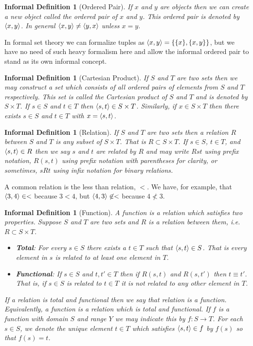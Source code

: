 \documentclass[12pt]{article}
\theoremstyle{break}
\theoremstyle{break}
\theoremstyle{break}
\theoremstyle{break}
\theoremstyle{break}
\newtheorem{informal definition}[definition]{Informal Definition}
\begin{document}
\begin{informal definition}[Ordered Pair]
If $x$ and $y$ are objects then we can create a new object called the ordered pair of $x$ and $y$.
This ordered pair is denoted by $\braket{x, y}$.
In general $\braket{x, y} \not = \braket{y, x}$ unless $x = y$.
\end{informal definition}
In formal set theory we can formalize tuples as $\braket{x, y} = \{\{x\}, \{x, y\}\}$, but we have no need of such heavy formalism here and allow the informal ordered pair to stand as its own informal concept.

\begin{informal definition}[Cartesian Product]
If $S$ and $T$ are two sets then we may construct a set which consists of all ordered pairs of elements from $S$ and $T$ respectively.
This set is called the Cartesian product of $S$ and $T$ and is denoted by $S\times T$.
If $s\in S$ and $t\in T$ then $\braket{s, t} \in S\times T$.
Similarly, if $x\in S\times T$ then there exists $s\in S$ and $t\in T$ with $x = \braket{s, t}$.
\end{informal definition}

\begin{informal definition}[Relation]
If $S$ and $T$ are two sets then a relation $R$ between $S$ and $T$ is any subset of $S\times T$. That is $R\subset S\times T$.
If $s\in S$, $t\in T$, and $\braket{s, t}\in R$ then we say $s$ and $t$ are related by $R$ and may write $Rst$ using prefix notation, $R(s, t)$ using prefix notation with parentheses for clarity, or sometimes, $sRt$ using infix notation for binary relations.
\end{informal definition}
A common relation is the less than relation, $<$.
We have, for example, that $\braket{3, 4} \in <$ because $3<4$, but $\braket{4,3}\not \in <$ because $4\not < 3$.

\begin{informal definition}[Function]
A function is a relation which satisfies two properties.
Suppose $S$ and $T$ are two sets and $R$ is a relation between them, i.e. $R\subset S\times T$.
\begin{itemize}
\item{\textbf{Total}: For every $s\in S$ there exists a $t\in T$ such that $\braket{s, t} \in S$. That is every element in $s$ is related to at least one element in $T$.}
\item{\textbf{Functional}: If $s\in S$ and $t, t'\in T$ then if $R(s, t)$ and $R(s, t')$ then $t\equiv t'$. That is, if $s\in S$ is related to $t\in T$ it is not related to any other element in $T$.}
\end{itemize}
If a relation is total and functional then we say that relation is a function.
Equivalently, a function is a relation which is total and functional.
If $f$ is a function with domain $S$ and range $Y$ we may indicate this by $f:S\to T$.
For each $s\in S$, we denote the unique element $t\in T$ which satisfies $\braket{s, t}\in f$ by $f(s)$ so that $f(s) = t$.
\end{informal definition}
\end{document}
